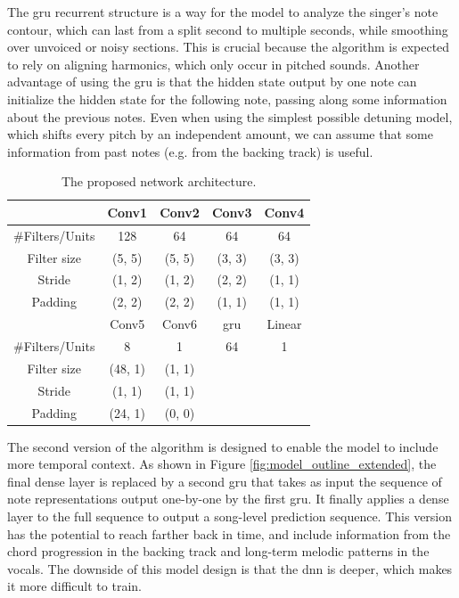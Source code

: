 The \gls{gru} recurrent structure is a way for the model to analyze the singer's note contour, which can last from a split second to multiple seconds, while smoothing over unvoiced or noisy sections. This is crucial because the algorithm is expected to rely on aligning harmonics, which only occur in pitched sounds. Another advantage of using the \gls{gru} is that the hidden state output by one note can initialize the hidden state for the following note, passing along some information about the previous notes. Even when using the simplest possible detuning model, which shifts every pitch by an independent amount, we can assume that some information from past notes (e.g. from the backing track) is useful.

\begin{table}[t]
  \begin{center}
    \caption{The proposed network architecture.}
    \begin{tabular}{|c||c|c|c|c|}
    \hline
      & Conv1 & Conv2 & Conv3 & Conv4 \\
      \hline
      \#Filters/Units & 128 & 64 & 64 & 64 \\
      Filter size & (5, 5) & (5, 5) & (3, 3) & (3, 3) \\
      Stride & (1, 2) & (1, 2) & (2, 2) & (1, 1) \\
      Padding & (2, 2) & (2, 2) & (1, 1) & (1, 1) \\
      \hline
      & Conv5 & Conv6 & \gls{gru} & Linear \\
      \hline
      \#Filters/Units & 8 & 1 & 64 & 1 \\
      Filter size & (48, 1) & (1, 1) & & \\
      Stride & (1, 1) & (1, 1) & & \\
      Padding & (24, 1) & (0, 0) & & \\
      \hline
    \end{tabular}
    \vspace{-.1in}
    \label{tab:network}
  \end{center}
\end{table}

The second version of the algorithm is designed to enable the model to include more temporal context. As shown in Figure \ref{fig:model_outline_extended}, the final dense layer is replaced by a second \gls{gru} that takes as input the sequence of note representations output one-by-one by the first \gls{gru}. It finally applies a dense layer to the full sequence to output a song-level prediction sequence. This version has the potential to reach farther back in time, and include information from the chord progression in the backing track and long-term melodic patterns in the vocals. The downside of this model design is that the \gls{dnn} is deeper, which makes it more difficult to train. 

